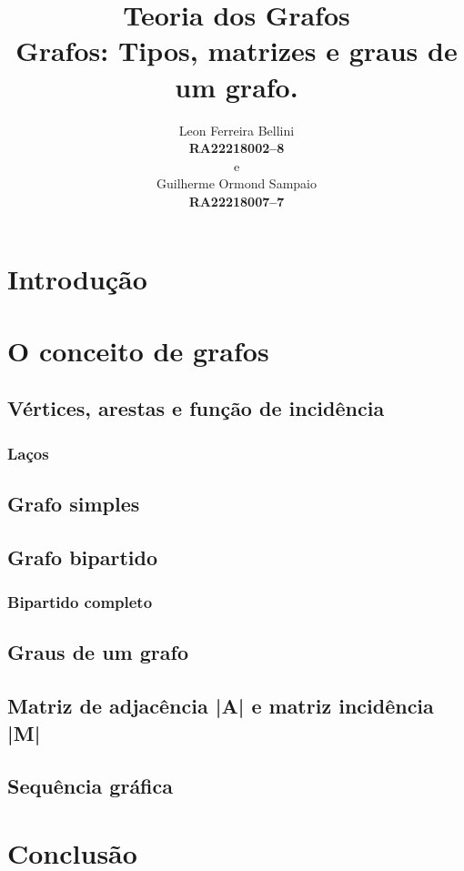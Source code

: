 \documentclass[a4paper, 12pt]{article}
\begin{document}
\title{\textbf{Teoria dos Grafos}\\ \small{Grafos: Tipos, matrizes e graus de um grafo.}}
\author{Leon Ferreira Bellini\\
	\small{\textbf{RA\@ 22218002--8}}\\
	e\\
   Guilherme Ormond Sampaio\\
   \small{\textbf{RA\@ 22218007--7}}
}
\date{}
\maketitle
\section{Introdução}
\section{O conceito de grafos}
\subsection{Vértices, arestas e função de incidência {\phi}}
\subsubsection{Laços}
\subsection{Grafo simples}
\subsection{Grafo bipartido}
\subsubsection{Bipartido completo}
\subsection{Graus de um grafo}
\subsection{Matriz de adjacência |A| e matriz incidência |M| }
\subsection{Sequência gráfica}
\section{Conclusão}
\end{document}
